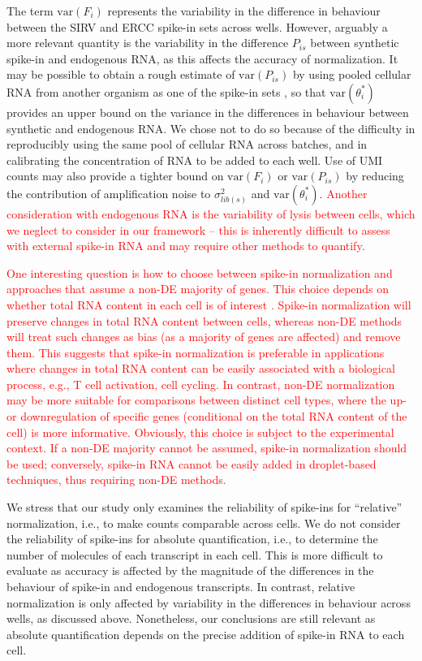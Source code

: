 \documentclass{article}
\newcommand{\revised}[1]{\textcolor{red}{#1}}
\newcommand\variance{\mbox{var}}
\begin{document}
The term $\variance(F_i)$ represents the variability in the difference in behaviour between the SIRV and ERCC spike-in sets across wells.
However, arguably a more relevant quantity is the variability in the difference $P_{is}$ between synthetic spike-in and endogenous RNA, as this affects the accuracy of normalization.
It may be possible to obtain a rough estimate of $\variance(P_{is})$ by using pooled cellular RNA from another organism as one of the spike-in sets \citep{brennecke2013accounting}, so that $\variance(\theta^*_i)$ provides an upper bound on the variance in the differences in behaviour between synthetic and endogenous RNA.
We chose not to do so because of the difficulty in reproducibly using the same pool of cellular RNA across batches, and in calibrating the concentration of RNA to be added to each well.
Use of UMI counts may also provide a tighter bound on $\variance(F_i)$ or $\variance(P_{is})$ by reducing the contribution of amplification noise to $\sigma^2_{lib(s)}$ and $\variance(\theta^*_i)$.
\revised{Another consideration with endogenous RNA is the variability of lysis between cells, which we neglect to consider in our framework -- this is inherently difficult to assess with external spike-in RNA and may require other methods to quantify.}

\revised{One interesting question is how to choose between spike-in normalization and approaches that assume a non-DE majority of genes.
This choice depends on whether total RNA content in each cell is of interest \citep{lun2016stepbystep}.
Spike-in normalization will preserve changes in total RNA content between cells, whereas non-DE methods will treat such changes as bias (as a majority of genes are affected) and remove them.
This suggests that spike-in normalization is preferable in applications where changes in total RNA content can be easily associated with a biological process, e.g., T cell activation,   cell cycling.
In contrast, non-DE normalization may be more suitable for comparisons between distinct cell types, where the up- or downregulation of specific genes (conditional on the total RNA content of the cell) is more informative.
Obviously, this choice is subject to the experimental context.
If a non-DE majority cannot be assumed, spike-in normalization should be used; conversely, spike-in RNA cannot be easily added in droplet-based techniques, thus requiring non-DE methods.}

We stress that our study only examines the reliability of spike-ins for ``relative'' normalization, i.e., to make counts comparable across cells.
We do not consider the reliability of spike-ins for absolute quantification, i.e., to determine the number of molecules of each transcript in each cell.
This is more difficult to evaluate as accuracy is affected by the magnitude of the differences in the behaviour of spike-in and endogenous transcripts.
In contrast, relative normalization is only affected by variability in the differences in behaviour across wells, as discussed above.
Nonetheless, our conclusions are still relevant as absolute quantification depends on the precise addition of spike-in RNA to each cell.
\end{document}
